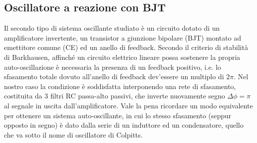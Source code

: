 \documentclass{article}[a4paper, oneside, 11pt]
\begin{document}
\subsection{Oscillatore a reazione con BJT}
Il secondo tipo di sistema oscillante studiato è un circuito dotato di
un amplificatore invertente, un transistor a giunzione bipolare (BJT) montato
ad emettitore comune (CE) ed un anello di feedback.
Secondo il criterio di stabilità di Barkhausen, affinché un circuito
elettrico lineare possa sostenere la propria auto-oscillazione è necessaria
la presenza di un feedback positivo, i.e. lo sfasamento totale dovuto
all'anello di feedback dev'essere un multiplo di $2\pi$. Nel nostro caso la
condizione è soddisfatta interponendo una rete di sfasamento, costituita da
3 filtri RC passa-alto passivi, che inverte nuovamente segno
$\Delta \phi = \pi$
al segnale in uscita dall'amplificatore. Vale la pena ricordare un
modo equivalente per ottenere un sistema auto-oscillante, in cui lo stesso
sfasamento (seppur opposto in segno) è dato dalla serie di un induttore ed
un condensatore, quello che va sotto il nome di oscillatore di Colpitts.
\end{document}

